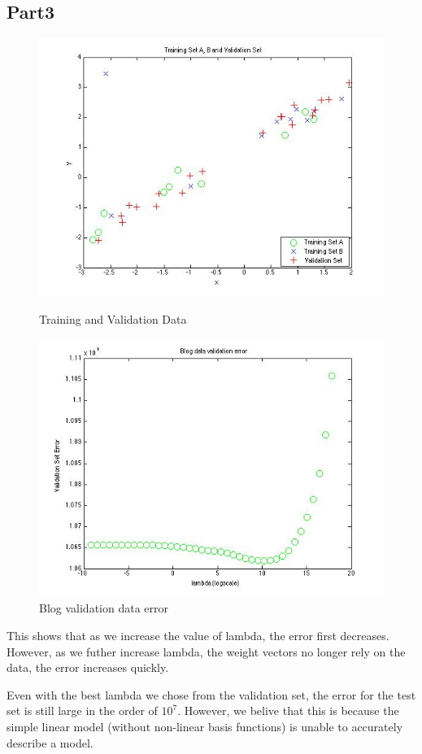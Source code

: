 \subsection{Part3}
\begin{figure}[!htb]
  \includegraphics[width=\linewidth]{figures/p3_training_validation_data}
  \caption{Training and Validation Data}\label{fig:figures/p3_training_validation_data}
  \endminipage\hfill
  \includegraphics[width=\linewidth]{figures/p3_blogdata_lambda}
  \caption{Blog validation data error}
  \endminipage\hfill
\end{figure}

This shows that as we increase the value of lambda, the error first decreases. However, as we futher
increase lambda, the weight vectors no longer rely on the data, the error increases quickly. 


Even with the best lambda we chose from the validation set, the error for the test set is still large
in the order of $10^{7}$. However, we belive that this is because the simple linear model (without non-linear basis functions) is unable to accurately describe a model. 
